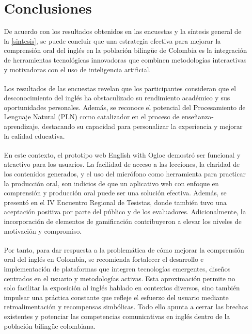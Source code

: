\section{Conclusiones}

De acuerdo con los resultados obtenidos en las encuestas y la síntesis general de la  \autoref{sintesis}, se puede concluir que una estrategia efectiva para mejorar la comprensión oral del inglés en la población bilingüe de Colombia es la integración de herramientas tecnológicas innovadoras que combinen metodologías interactivas y motivadoras con el uso de inteligencia artificial.
\\
\\
Los resultados de las encuestas revelan que los participantes consideran que el desconocimiento del inglés ha obstaculizado su rendimiento académico y sus oportunidades personales. Además, se reconoce el potencial del Procesamiento de Lenguaje Natural (PLN) como catalizador en el proceso de enseñanza-aprendizaje, destacando su capacidad para personalizar la experiencia y mejorar la calidad educativa.
\\
\\
En este contexto, el prototipo web English with Ogloc demostró ser funcional y atractivo para los usuarios. La facilidad de acceso a las lecciones, la claridad de los contenidos generados, y el uso del micrófono como herramienta para practicar la producción oral, son indicios de que un aplicativo web con enfoque en comprensión y producción oral puede ser una solución efectiva. Además, se presentó en el IV Encuentro Regional de Tesistas, donde también tuvo una aceptación positiva por parte del público y de los evaluadores. Adicionalmente, la incorporación de elementos de gamificación contribuyeron a elevar los niveles de motivación y compromiso.
\\
\\
Por tanto, para dar respuesta a la problemática de cómo mejorar la comprensión oral del inglés en Colombia, se recomienda fortalecer el desarrollo e implementación de plataformas que integren tecnologías emergentes, diseños centrados en el usuario y metodologías activas. Esta aproximación permite no solo facilitar la exposición al inglés hablado en contextos diversos, sino también impulsar una práctica constante que refleje el esfuerzo del usuario mediante retroalimentación y recompensas simbólicas. Todo ello apunta a cerrar las brechas existentes y potenciar las competencias comunicativas en inglés dentro de la población bilingüe colombiana.

